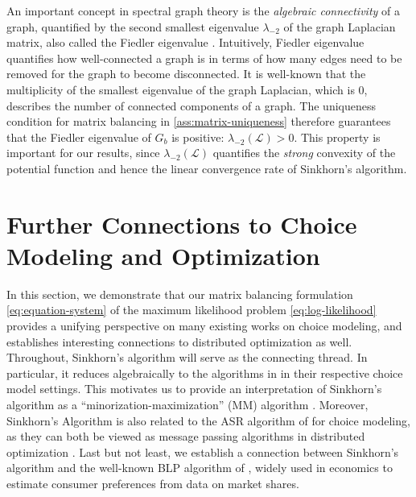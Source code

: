 An important concept in spectral graph theory is the \emph{algebraic connectivity} of a graph, quantified by the second smallest eigenvalue $\lambda_{-2}$ of the graph Laplacian matrix, also called the Fiedler eigenvalue \citep{fiedler1973algebraic,spielman2007spectral}.
Intuitively, Fiedler eigenvalue quantifies how well-connected a graph is in terms of how many edges need to be removed for the graph to become disconnected. It is well-known that the multiplicity of the smallest eigenvalue of the graph Laplacian, which is 0, describes the number of connected components of a graph. The uniqueness condition for matrix balancing in \cref{ass:matrix-uniqueness} therefore guarantees that the Fiedler eigenvalue of $G_b$ is positive: $\lambda_{-2}(\mathcal{L}) >0$. This property is important for our results, since $\lambda_{-2}(\mathcal{L})$ quantifies the \emph{strong} convexity of the potential function and hence the linear convergence rate of Sinkhorn's algorithm.

\section{Further Connections to Choice Modeling and Optimization}
\label{sec:connections}
In this section, we demonstrate that our matrix balancing formulation \eqref{eq:equation-system} of the maximum likelihood problem \eqref{eq:log-likelihood} provides a unifying perspective on many existing works on choice modeling, and establishes interesting connections to distributed optimization as well. Throughout, Sinkhorn's algorithm will serve as the connecting thread. In particular, it reduces algebraically to the algorithms in \citet{zermelo1929berechnung,dykstra1956note,ford1957solution,hunter2004mm,maystre2017choicerank} in their respective choice model settings. This motivates us to provide an interpretation of Sinkhorn's algorithm as a ``minorization-maximization'' (MM) algorithm \citep{lange2000optimization}. Moreover, Sinkhorn's Algorithm is also related to the ASR algorithm of \citet{agarwal2018accelerated} for choice modeling, as they can both be viewed as message passing algorithms in distributed optimization \citep{balakrishnan2004polynomial}. Last but not least, we establish a connection between Sinkhorn's algorithm and the well-known BLP algorithm of \citet{berry1995automobile}, widely used in economics to estimate consumer preferences from data on market shares. 

